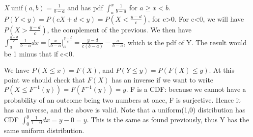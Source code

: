 \documentclass{article}
\begin{document}
\begin{prob}
	 $X~\text{unif}(a,b)=\frac{1}{b-a}$ and has pdf $\int_{a}^{x}\frac{1}{b-a}$ for $a \geq x < b$.
	 $P(Y<y)=P(cX+d<y)=P(X<\frac{y-d}{c})$, for c>0.
	 For c<0, we will have $P(X>\frac{y-d}{c})$, the complement of the previous.
	 We then have $\int_{a}^{\frac{y-d}{c}}\frac{1}{b-a}dx= \big[\frac{x}{b-a}\big|_{a}^{\frac{y-d}{c}} =\frac{y-d}{c(b-a)}-\frac{a}{b-a}$, which is the pdf of Y.
	The result would be 1 minus that if c<0.
\end{prob}

\begin{prob}
	We have $P(X \leq x)=F(X)$, and $P(Y \leq y)=P(F(X) \leq y)$.
	At this point we should check that $F(X)$ has an inverse if we want to write $P(X \leq F^{-1}(y))=F(F^{-1}(y))=y$.
	F is a CDF: because we cannot have a probability of an outcome being two numbers at once, F is surjective. Hence it has an inverse, and the above is valid.
	Note that a uniform(1,0) distribution has CDF $\int^{y}_{0}\frac{1}{1-0}dx=y-0=y$. This is the same as found previously, thus Y has the same uniform distribution.
\end{prob}
\end{document}
